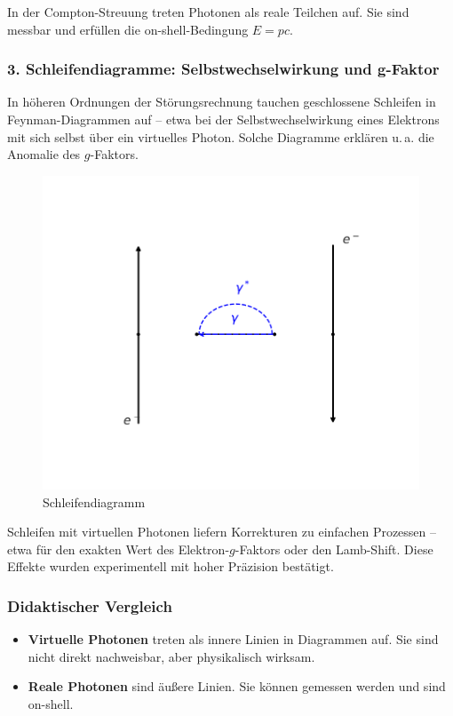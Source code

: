 \begin{tcolorbox}[physikbox, title=Reale Photonen]
	\label{box:Reale Photonen}
	In der Compton-Streuung treten Photonen als reale Teilchen auf. Sie sind messbar und erfüllen die on-shell-Bedingung $E = pc$.
\end{tcolorbox}

\subsubsection*{3. Schleifendiagramme: Selbstwechselwirkung und g-Faktor}
In höheren Ordnungen der Störungsrechnung tauchen geschlossene Schleifen in Feynman-Diagrammen auf – etwa bei der Selbstwechselwirkung eines Elektrons mit sich selbst über ein virtuelles Photon. Solche Diagramme erklären u.\,a. die Anomalie des $g$-Faktors.
\begin{figure}[H]
	\begin{center}
		\includegraphics[width=0.4\linewidth]{bilder/vertex-korrektur.pdf}
	\end{center}
	\caption{Schleifendiagramm}
\end{figure}

\begin{tcolorbox}[hinweisbox, title=Schleifendiagramme und Präzisionseffekte]
	\label{box:Schleifendiagramme}
	Schleifen mit virtuellen Photonen liefern Korrekturen zu einfachen Prozessen – etwa für den exakten Wert des Elektron-$g$-Faktors oder den Lamb-Shift. Diese Effekte wurden experimentell mit hoher Präzision bestätigt.
\end{tcolorbox}

\subsubsection*{Didaktischer Vergleich}
\begin{itemize}
	\item \textbf{Virtuelle Photonen} treten als innere Linien in Diagrammen auf. Sie sind nicht direkt nachweisbar, aber physikalisch wirksam.
	\item \textbf{Reale Photonen} sind äußere Linien. Sie können gemessen werden und sind on-shell.
\end{itemize}

